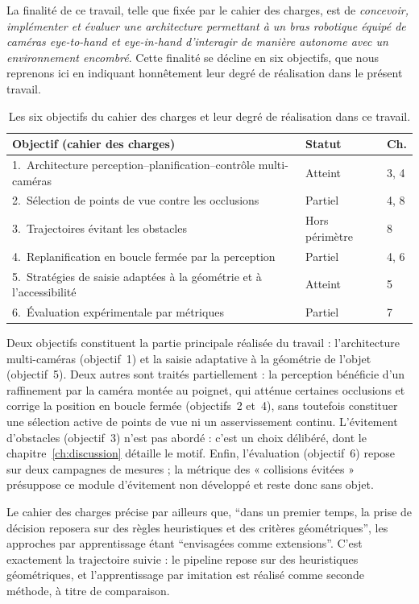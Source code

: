 La finalité de ce travail, telle que fixée par le cahier des charges, est de \emph{concevoir, implémenter et évaluer une architecture permettant à un bras robotique équipé de caméras \textit{eye-to-hand} et \textit{eye-in-hand} d'interagir de manière autonome avec un environnement encombré}. Cette finalité se décline en six objectifs, que nous reprenons ici en indiquant honnêtement leur degré de réalisation dans le présent travail.

\begin{table}[ht]
\centering
\renewcommand{\arraystretch}{1.2}
\begin{tabularx}{\linewidth}{@{}Xll@{}}
\toprule
\textbf{Objectif (cahier des charges)} & \textbf{Statut} & \textbf{Ch.} \\
\midrule
1.~Architecture perception--planification--contrôle multi-caméras & Atteint & 3, 4 \\
2.~Sélection de points de vue contre les occlusions & Partiel & 4, 8 \\
3.~Trajectoires évitant les obstacles & Hors périmètre & 8 \\
4.~Replanification en boucle fermée par la perception & Partiel & 4, 6 \\
5.~Stratégies de saisie adaptées à la géométrie et à l'accessibilité & Atteint & 5 \\
6.~Évaluation expérimentale par métriques & Partiel & 7 \\
\bottomrule
\end{tabularx}
\caption{Les six objectifs du cahier des charges et leur degré de réalisation dans ce travail.}
\label{tab:objectifs}
\end{table}

Deux objectifs constituent la partie principale réalisée du travail : l'architecture multi-caméras (objectif~1) et la saisie adaptative à la géométrie de l'objet (objectif~5). Deux autres sont traités partiellement : la perception bénéficie d'un raffinement par la caméra montée au poignet, qui atténue certaines occlusions et corrige la position en boucle fermée (objectifs~2 et~4), sans toutefois constituer une sélection active de points de vue ni un asservissement continu. L'évitement d'obstacles (objectif~3) n'est pas abordé : c'est un choix délibéré, dont le chapitre~\ref{ch:discussion} détaille le motif. Enfin, l'évaluation (objectif~6) repose sur deux campagnes de mesures ; la métrique des « collisions évitées » présuppose ce module d'évitement non développé et reste donc sans objet.

Le cahier des charges précise par ailleurs que, \enquote{dans un premier temps, la prise de décision reposera sur des règles heuristiques et des critères géométriques}, les approches par apprentissage étant \enquote{envisagées comme extensions}. C'est exactement la trajectoire suivie : le pipeline repose sur des heuristiques géométriques, et l'apprentissage par imitation est réalisé comme seconde méthode, à titre de comparaison.

